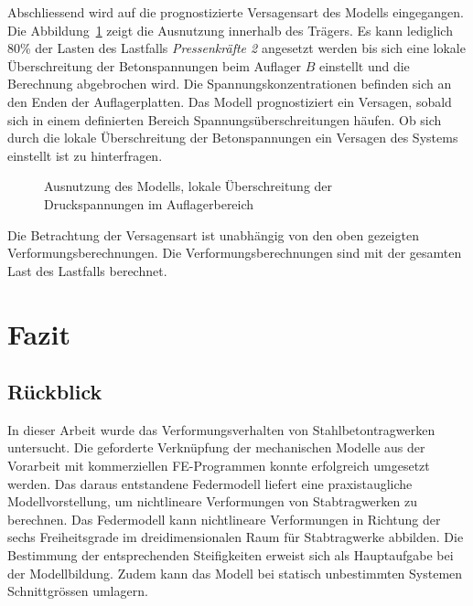 \documentclass[
  11pt,
  letterpaper,
]{scrreprt}
\begin{document}
Abschliessend wird auf die prognostizierte Versagensart des Modells
eingegangen. Die Abbildung~\ref{fig-versagen_ideastat} zeigt die
Ausnutzung innerhalb des Trägers. Es kann lediglich 80\% der Lasten des
Lastfalls \emph{Pressenkräfte 2} angesetzt werden bis sich eine lokale
Überschreitung der Betonspannungen beim Auflager \(B\) einstellt und die
Berechnung abgebrochen wird. Die Spannungskonzentrationen befinden sich
an den Enden der Auflagerplatten. Das Modell prognostiziert ein
Versagen, sobald sich in einem definierten Bereich
Spannungsüberschreitungen häufen. Ob sich durch die lokale
Überschreitung der Betonspannungen ein Versagen des Systems einstellt
ist zu hinterfragen.

\begin{figure}[H]


\caption{\label{fig-versagen_ideastat}Ausnutzung des Modells, lokale
Überschreitung der Druckspannungen im Auflagerbereich}

\end{figure}%

Die Betrachtung der Versagensart ist unabhängig von den oben gezeigten
Verformungsberechnungen. Die Verformungsberechnungen sind mit der
gesamten Last des Lastfalls berechnet.


\chapter{Fazit}\label{fazit}

\section{Rückblick}\label{ruxfcckblick}

In dieser Arbeit wurde das Verformungsverhalten von Stahlbetontragwerken
untersucht. Die geforderte Verknüpfung der mechanischen Modelle aus der
Vorarbeit mit kommerziellen FE-Programmen konnte erfolgreich umgesetzt
werden. Das daraus entstandene Federmodell liefert eine praxistaugliche
Modellvorstellung, um nichtlineare Verformungen von Stabtragwerken zu
berechnen. Das Federmodell kann nichtlineare Verformungen in Richtung
der sechs Freiheitsgrade im dreidimensionalen Raum für Stabtragwerke
abbilden. Die Bestimmung der entsprechenden Steifigkeiten erweist sich
als Hauptaufgabe bei der Modellbildung. Zudem kann das Modell bei
statisch unbestimmten Systemen Schnittgrössen umlagern.
\end{document}
